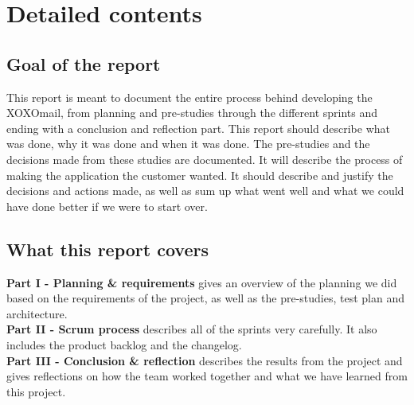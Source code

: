 \chapter*{Detailed contents}

\section*{Goal of the report}
This report is meant to document the entire process behind developing the XOXOmail, from planning and pre-studies through the different sprints and ending with a conclusion and reflection part. This report should describe what was done, why it was done and when it was done. The pre-studies and the decisions made from these studies are documented. It will describe the process of making the application the customer wanted. It should describe and justify the decisions and actions made, as well as sum up what went well and what we could have done better if we were to start over.

\section*{What this report covers}
\textbf{Part I - Planning \& requirements} gives an overview of the planning we did based on the  \hspace*{4.3em} requirements of the project, as well as the pre-studies, test plan and architecture. \\
\textbf{Part II - Scrum process} describes all of the sprints very carefully. It also includes the product  \hspace*{4.3em} backlog and the changelog.\\
\textbf{Part III - Conclusion \& reflection} describes the results from the project and gives reflections \hspace*{4.3em} on how the team worked together and what we have learned from this project.\\

